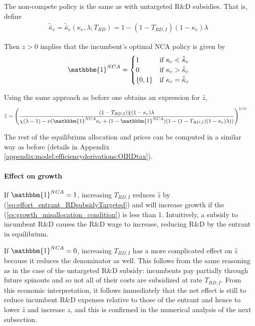 \documentclass[11pt,english]{article}
\theoremstyle{definition}
\begin{document}
The non-compete policy is the same as with untargeted R\&D subsidies. That is, define
\begin{align}
\tilde{\bar{\kappa}}_c = \tilde{\bar{\kappa}}_c(\kappa_e,\lambda;T_{RD}) = 1 - (1-T_{RD,I})(1-\kappa_e)\lambda
\end{align} 

Then $z > 0$ implies that the incumbent's optimal NCA policy is given by 
\begin{align}
\mathbbm{1}^{NCA} = \begin{cases}
1 & \textrm{if } \kappa_{c} < \tilde{\bar{\kappa}}_c  \\
0 & \textrm{if } \kappa_{c} > \tilde{\bar{\kappa}}_c \\
\{0,1\} & \textrm{if } \kappa_c = \tilde{\bar{\kappa}}_c 
\end{cases} \label{eq:nca_policy_RDsubsidyTargeted}
\end{align}

Using the same approach as before one obtains an expression for $\hat{z}$, 
\begin{align}
	\hat{z} &= \Bigg( \frac{(1-T_{RD,I})\hat{\chi} (1-\kappa_{e}) \lambda}{\chi(\lambda -1) - \nu (\mathbbm{1}^{NCA} \kappa_c + (1-\mathbbm{1}^{NCA})(1 - (1-T_{RD,I})(1-\kappa_e)\lambda)) } \Bigg)^{1/\psi} \label{eq:effort_entrant_RDsubsidyTargeted}
\end{align}

The rest of the equilibrium allocation and prices can be computed in a similar way as before (details in Appendix \ref{appendix:model:efficiencyderivations:OIRDtax}). 






\paragraph{Effect on growth}

If $\mathbbm{1}^{NCA} = 1$, increasing $T_{RD,I}$ reduces $\hat{z}$ by (\ref{eq:effort_entrant_RDsubsidyTargeted}) and will increase growth if the (\ref{cs:growth_misallocation_condition}) is less than 1. Intuitively, a subsidy to incumbent R\&D causes the R\&D wage to increase, reducing R\&D by the entrant in equilibrium. 

If $\mathbbm{1}^{NCA} = 0$, increasing $T_{RD,I}$ has a more complicated effect on $\hat{z}$ because it reduces the denominator as well. This follows from the same reasoning as in the case of the untargeted R\&D subsidy: incumbents pay partially through future spinouts and so not all of their costs are subsidized at rate $T_{RD,I}$. From this economic interpretation, it follows immediately that the net effect is still to reduce incumbent R\&D expenses relative to those of the entrant and hence to lower $\hat{z}$ and increase $z$, and this is confirmed in the numerical analysis of the next subsection.
\end{document}
